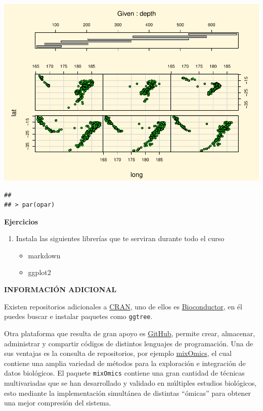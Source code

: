 \documentclass[
]{book}
\providecommand{\tightlist}{%
  \setlength{\itemsep}{0pt}\setlength{\parskip}{0pt}}
\begin{document}
\includegraphics{bookdown-demo_files/figure-latex/unnamed-chunk-5-11.pdf}

\begin{verbatim}
## 
## > par(opar)
\end{verbatim}

\textbf{Ejercicios}

\begin{enumerate}
\def\labelenumi{\arabic{enumi}.}
\tightlist
\item
  Instala las siguientes librerías que te serviran durante todo el curso

  \begin{itemize}
  \tightlist
  \item
    markdown
  \item
    ggplot2
  \end{itemize}
\end{enumerate}

\textbf{INFORMACIÓN ADICIONAL}

Existen repositorios adicionales a \href{https://cran.r-project.org/}{CRAN}, uno de ellos es \href{https://https://bioconductor.org/}{Bioconductor}, en él puedes buscar e instalar paquetes como \texttt{ggtree}.

Otra plataforma que resulta de gran apoyo es \href{https://docs.github.com/es}{GitHub}, permite crear, almacenar, administrar y compartir códigos de distintos lenguajes de programación. Una de sus ventajas es la consulta de repositorios, por ejemplo \href{https://github.com/mixOmicsTeam/mixOmics}{mixOmics}, el cual contiene una amplia variedad de métodos para la exploración e integración de datos biológicos. El paquete \texttt{mixOmics} contiene una gran cantidad de técnicas multivariadas que se han desarrollado y validado en múltiples estudios biológicos, esto mediante la implementación simultánea de distintas ``ómicas'' para obtener una mejor compresión del sistema.
\end{document}
